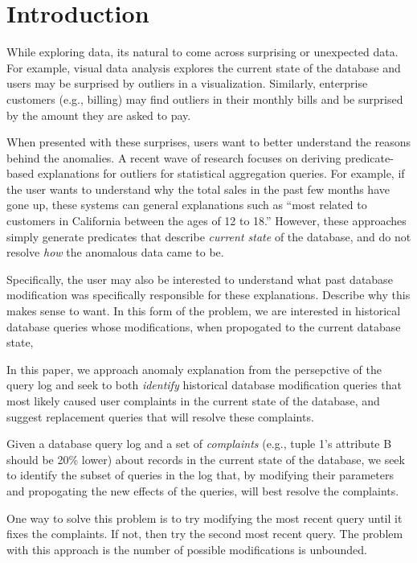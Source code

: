 
\section{Introduction}

While exploring data, its natural to come across surprising or unexpected data.
For example, visual data analysis explores the current state of the database and users may be surprised by outliers in a visualization.
Similarly, enterprise customers (e.g., billing) may find outliers in their monthly bills and be surprised by the amount they are asked to pay.

When presented with these surprises, users want to better understand the reasons behind the anomalies.
A recent wave of research focuses on deriving predicate-based explanations for outliers for statistical aggregation queries.
For example, if the user wants to understand why the total sales in the past few months have gone up, these systems can general explanations such as ``most related to customers in California between the ages of 12 to 18.''
However, these approaches simply generate predicates that describe {\it current state} of the database, and do not resolve {\it how} the anomalous data came to be.

Specifically, the user may also be interested to understand what past database modification was specifically responsible for these explanations.
Describe why this makes sense to want.  In this form of the problem, we are interested in historical database queries whose modifications, when propogated to the current database state, 


In this paper, we approach anomaly explanation from the persepctive of the query log and seek to
both {\it identify}  historical database modification queries that most likely caused user complaints 
in the current state of the database, and suggest replacement queries that will resolve these complaints.

Given a database query log and a set of {\it complaints} (e.g., tuple 1's attribute B should be 20\% lower) about records in the current state of the database,
we seek to identify the subset of queries in the log that, by modifying their parameters and propogating the new effects of the queries, 
will best resolve the complaints.  

One way to solve this problem is to try modifying the most recent query until it fixes the complaints.  If not, then try the second most recent query.  The problem with this approach is the number of possible modifications is unbounded.

